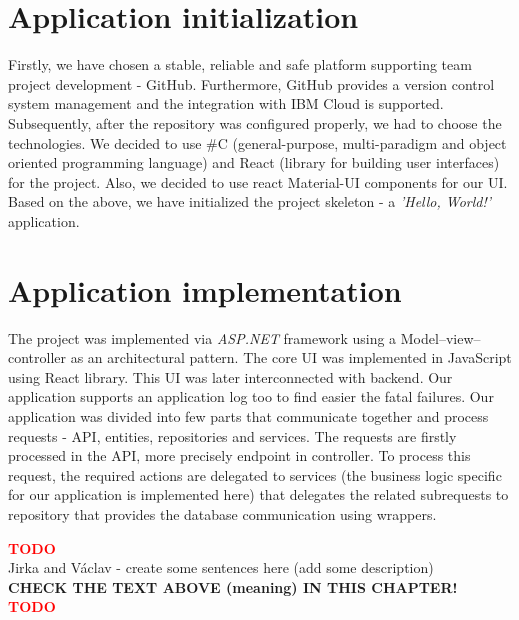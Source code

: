 \documentclass[11pt,a4paper]{article}
\newcommand{\TODO}{\textbf{\textcolor{red}{TODO}}} %
\begin{document}
\section{Application initialization}

Firstly, we have chosen a stable, reliable and safe platform supporting team project development - GitHub. Furthermore, GitHub provides a version control system management and the integration with IBM Cloud is supported. Subsequently, after the repository was configured properly, we had to choose the technologies. We decided to use \#C (general-purpose, multi-paradigm and object oriented programming language) and React (library for building user interfaces) for the project. Also, we decided to use react Material-UI components for our UI. Based on the above, we have initialized the project skeleton - a \textit{'Hello, World!'} application.

\section{Application implementation}

The project was implemented via \textit{ASP.NET} framework using a Model--view--controller as an architectural pattern. The core UI was implemented in JavaScript using React library. This UI was later interconnected with backend. Our application supports an application log too to find easier the fatal failures. Our application was divided into few parts that communicate together and process requests - API, entities, repositories and services. The requests are firstly processed in the API, more precisely endpoint in controller. To process this request, the required actions are delegated to services (the business logic specific for our application is implemented here) that delegates the related subrequests to repository that provides the database communication using wrappers.

\begin{center}
    \TODO\\
    Jirka and Václav - create some sentences here (add some description)\\
    \textbf{CHECK THE TEXT ABOVE (meaning) IN THIS CHAPTER!}\\
    \TODO
\end{center}
\end{document}

